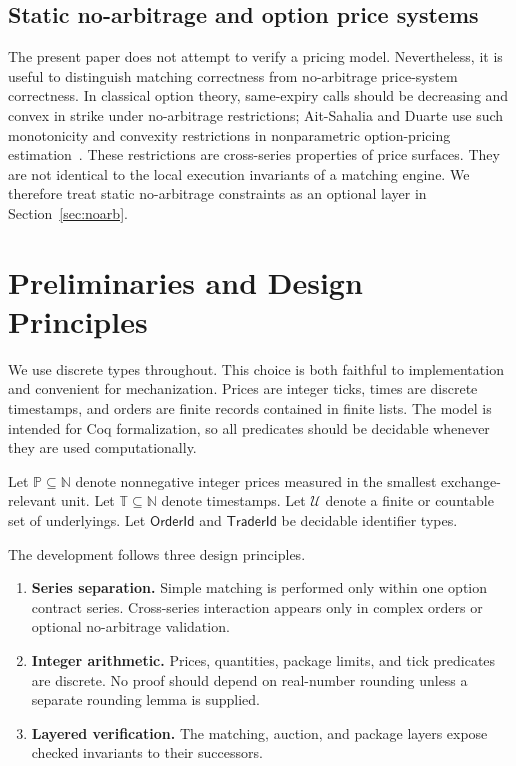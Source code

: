 \documentclass[11pt]{article}
\newcommand{\Price}{\mathbb P}
\newcommand{\Time}{\mathbb T}
\begin{document}
\subsection{Static no-arbitrage and option price systems}

The present paper does not attempt to verify a pricing model. Nevertheless, it is useful to distinguish matching correctness from no-arbitrage price-system correctness. In classical option theory, same-expiry calls should be decreasing and convex in strike under no-arbitrage restrictions; Ait-Sahalia and Duarte use such monotonicity and convexity restrictions in nonparametric option-pricing estimation~\cite{AitSahaliaDuarte2002}. These restrictions are cross-series properties of price surfaces. They are not identical to the local execution invariants of a matching engine. We therefore treat static no-arbitrage constraints as an optional layer in Section~\ref{sec:noarb}.

\section{Preliminaries and Design Principles}

We use discrete types throughout. This choice is both faithful to implementation and convenient for mechanization. Prices are integer ticks, times are discrete timestamps, and orders are finite records contained in finite lists. The model is intended for Coq formalization, so all predicates should be decidable whenever they are used computationally.

Let \(\Price\subseteq \mathbb N\) denote nonnegative integer prices measured in the smallest exchange-relevant unit. Let \(\Time\subseteq\mathbb N\) denote timestamps. Let \(\mathcal U\) denote a finite or countable set of underlyings. Let \(\mathsf{OrderId}\) and \(\mathsf{TraderId}\) be decidable identifier types.

The development follows three design principles.
\begin{enumerate}[label=(P\arabic*)]
  \item \textbf{Series separation.} Simple matching is performed only within one option contract series. Cross-series interaction appears only in complex orders or optional no-arbitrage validation.
  \item \textbf{Integer arithmetic.} Prices, quantities, package limits, and tick predicates are discrete. No proof should depend on real-number rounding unless a separate rounding lemma is supplied.
  \item \textbf{Layered verification.} The matching, auction, and package layers expose checked invariants to their successors.
\end{enumerate}
\end{document}
